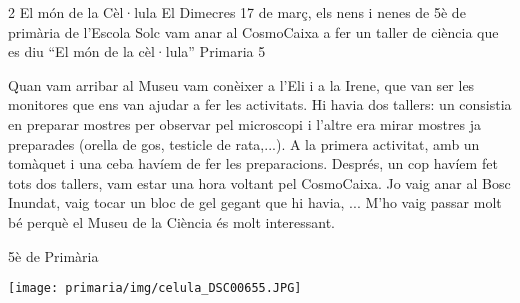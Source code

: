 
\begin{news}
{2} %
{El món de la Cèl·lula}
{El Dimecres 17 de març, els nens i nenes de 5è de primària de l’Escola Solc vam anar al CosmoCaixa a fer un taller de ciència que es diu “El món de la cèl·lula”}
{Primaria}
{5} %



Quan vam arribar al Museu vam conèixer a l’Eli i a la Irene, que van ser les monitores que ens van ajudar a fer les activitats. Hi havia dos tallers: un consistia en preparar mostres per observar pel microscopi i l’altre era mirar mostres ja preparades (orella de gos, testicle de rata,...). A la primera activitat, amb un tomàquet i una ceba havíem de fer les preparacions.
Després, un cop havíem fet tots dos tallers, vam estar una hora voltant pel CosmoCaixa. Jo vaig anar al Bosc Inundat, vaig tocar un bloc de gel gegant que hi havia, ...
M’ho vaig passar molt bé perquè el Museu de la Ciència és molt interessant.


							{5è de Primària}

\noindent\texttt{[image: primaria/img/celula\_DSC00655.JPG]}

\end{news}

\newssep
{}

